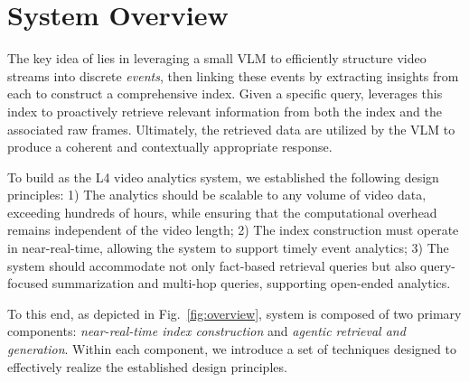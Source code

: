 \section{\sysname System Overview}
\label{sec:overview}




The key idea of \sysname lies in leveraging a small VLM to efficiently structure video streams into discrete \emph{events}, then linking these events by extracting insights from each to construct a comprehensive index. Given a specific query, \sysname leverages this index to proactively retrieve relevant information from both the index and the associated raw frames. Ultimately, the retrieved data are utilized by the VLM to produce a coherent and contextually appropriate response.




To build \sysname as the L4 video analytics system, we established the following design principles: 1) The analytics should be scalable to any volume of video data, \ie exceeding hundreds of hours, while ensuring that the computational overhead remains independent of the video length; 2) The index construction must operate in near-real-time, allowing the system to support timely event analytics; 3) The system should accommodate not only fact-based retrieval queries but also query-focused summarization and multi-hop queries, supporting open-ended analytics.




To this end, as depicted in Fig.~\ref{fig:overview}, \sysname system is composed of two primary components: \emph{near-real-time index construction} and \emph{agentic retrieval and generation}. Within each component, we introduce a set of techniques designed to effectively realize the established design principles.





